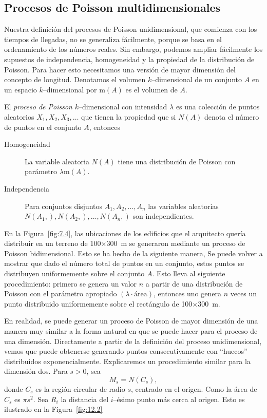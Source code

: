 \subsection{Procesos de Poisson multidimensionales}

	Nuestra definición del procesos de Poisson unidimensional, que comienza con los tiempos de llegadas, no se generaliza fácilmente, porque se basa en el ordenamiento de los números reales. Sin embargo, podemos ampliar fácilmente los supuestos de independencia, homogeneidad y la propiedad de la distribución de Poisson. Para hacer esto necesitamos una versión de mayor dimensión del concepto de longitud. Denotamos el volumen $k$--dimensional de un conjunto $A$ en un espacio $k$--dimensional por $\mathrm{m}\left(A\right)$ es el volumen de $A$.
	\begin{definition}
		El \textit{proceso de Poisson} $k$--dimensional con intensidad $\lambda$ es una colección de puntos aleatorios $X_{1}, X_{2}, X_{3},\ldots$ que tienen la propiedad que si $N\left(A\right)$ denota el número de puntos en el conjunto $A$, entonces
		\begin{description}
			\item[Homogeneidad] La variable aleatoria $N\left(A\right)$ tiene una distribución de Poisson con parámetro $\lambda\mathrm{m}\left(A\right)$.
			\item[Independencia] Para conjuntos disjuntos $A_{1}, A_{2},\ldots, A_{n}$ las variables aleatorias $N\left(A_{1},\right),N\left(A_{2},\right),\ldots,N\left(A_{n},\right)$ son independientes.
		\end{description}
	\end{definition}
	En la Figura~\ref{fig:7.4}, las ubicaciones de los edificios que el arquitecto quería distribuir en un terreno de \num{100}$\times$\SI{300}{\metre} se generaron mediante un proceso de Poisson bidimensional. Esto se ha hecho de la siguiente manera, Se puede volver a mostrar que dado el número total de puntos en un conjunto, estos puntos se distribuyen uniformemente sobre el conjunto $A$. Esto lleva al siguiente procedimiento: primero se genera un valor $n$ a partir de una distribución de Poisson con el parámetro apropiado $\left(\lambda\cdot\text{área}\right)$, entonces uno genera $n$ veces un punto distribuido uniformemente sobre el rectángulo de \num{100}$\times$\SI{300}{\metre}.

	En realidad, se puede generar un proceso de Poisson de mayor dimensión de una manera muy similar a la forma natural en que se puede hacer para el proceso de una dimensión. Directamente a partir de la definición del proceso unidimensional, vemos que puede obtenerse generando puntos consecutivamente con ``huecos'' distribuidos exponencialmente. Explicaremos un procedimiento similar para la dimensión dos. Para $s>0$, sea
	\[
		M_{s}=N\left(C_{s}\right),
	\]
	donde $C_{s}$ es la región circular de radio $s$, centrado en el origen. Como la área de $C_{s}$ es $\pi s^{2}$. Sea $R_{i}$ la distancia del $i$--ésimo punto más cerca al origen. Esto es ilustrado en la Figura~\ref{fig:12.2}


